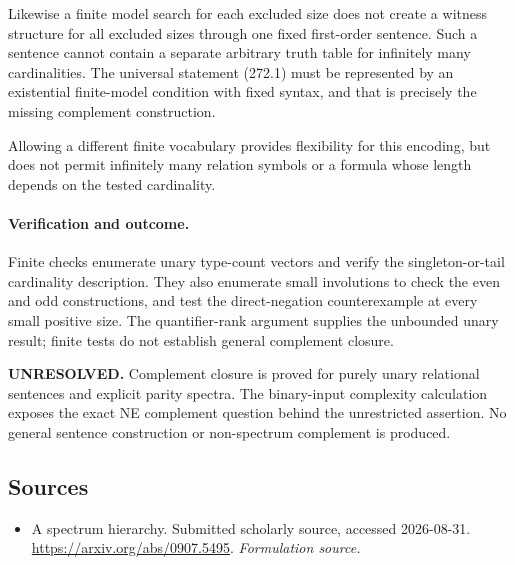 \documentclass[11pt]{article}
\begin{document}
Likewise a finite model search for each excluded size does not create a witness structure for all excluded sizes through one fixed first-order sentence. Such a sentence cannot contain a separate arbitrary truth table for infinitely many cardinalities. The universal statement (272.1) must be represented by an existential finite-model condition with fixed syntax, and that is precisely the missing complement construction.

Allowing a different finite vocabulary provides flexibility for this encoding, but does not permit infinitely many relation symbols or a formula whose length depends on the tested cardinality.

\paragraph{Verification and outcome.}
Finite checks enumerate unary type-count vectors and verify the singleton-or-tail cardinality description. They also enumerate small involutions to check the even and odd constructions, and test the direct-negation counterexample at every small positive size. The quantifier-rank argument supplies the unbounded unary result; finite tests do not establish general complement closure.

\textbf{UNRESOLVED.} Complement closure is proved for purely unary relational sentences and explicit parity spectra. The binary-input complexity calculation exposes the exact NE complement question behind the unrestricted assertion. No general sentence construction or non-spectrum complement is produced.

\subsection{Sources}
\begin{itemize}
\item[S1]A spectrum hierarchy. Submitted scholarly source, accessed 2026-08-31.
\url{https://arxiv.org/abs/0907.5495}.
\textit{Formulation source.}
\end{itemize}
\end{document}
